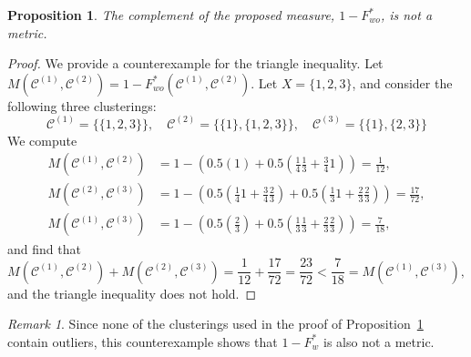 \documentclass[11pt]{article}
\newtheorem{prop}[thm]{Proposition}
\theoremstyle{remark}
\newtheorem*{remark}{Remark}
\newcommand\cCone{\mathcal{C}^{(1)}}
\newcommand\cCtwo{\mathcal{C}^{(2)}}
\newcommand\cCthree{\mathcal{C}^{(3)}}
\begin{document}
\begin{prop} \label{prop:metric}
    The complement of the proposed measure, $1 - F^*_{wo}$, is not a metric.
\end{prop}
\begin{proof}
    We provide a counterexample for the triangle inequality.
    Let $M(\cCone, \cCtwo) = 1 - F^*_{wo}(\cCone, \cCtwo)$.
    Let $X = \{1,2,3\}$, and consider the following three clusterings:
    \begin{equation*}
        \cCone = \{ \{1,2,3\} \}, \quad \cCtwo = \{ \{1\}, \{1,2,3\} \}, \quad \cCthree =  \{ \{1\}, \{2,3\} \}
    \end{equation*}
    We compute
    \begin{align*}
        M(\cCone, \cCtwo) &= 1 - \left( 0.5\left(1\right) + 0.5\left(\frac{1}{4}\frac{1}{3} + \frac{3}{4}1\right) \right) = \frac{1}{12},\\
        M(\cCtwo, \cCthree) &= 1 - \left( 0.5\left(\frac{1}{4}1 + \frac{3}{4}\frac{2}{3}\right) + 0.5\left(\frac{1}{3}1 + \frac{2}{3}\frac{2}{3}\right) \right) = \frac{17}{72},\\
        M(\cCone, \cCthree) &= 1 - \left( 0.5\left(\frac{2}{3}\right) + 0.5\left(\frac{1}{3}\frac{1}{3} + \frac{2}{3}\frac{2}{3}\right) \right) = \frac{7}{18},
    \end{align*}
    and find that
    \begin{equation*}
        M(\cCone, \cCtwo) + M(\cCtwo, \cCthree) = \frac{1}{12} + \frac{17}{72} = \frac{23}{72} < \frac{7}{18} = M(\cCone, \cCthree),
    \end{equation*}
    and the triangle inequality does not hold.
\end{proof}
\begin{remark}
    Since none of the clusterings used in the proof of Proposition~\ref{prop:metric} contain outliers, this counterexample shows that $1-F^*_w$ is also not a metric.
\end{remark}
\end{document}
